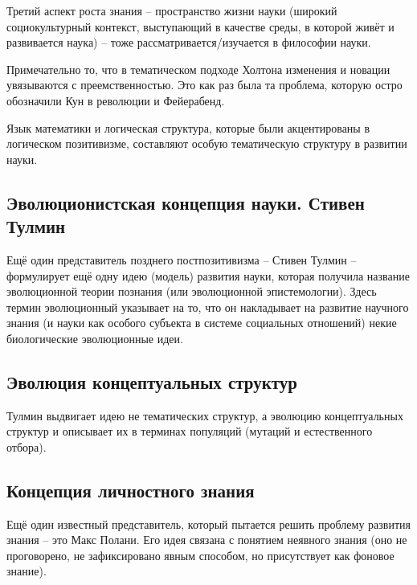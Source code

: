 \documentclass[main.tex]{subfiles}
\begin{document}

Третий аспект роста знания -- пространство жизни науки (широкий социокультурный контекст, выступающий в качестве среды, в которой живёт и развивается наука) -- тоже рассматривается/изучается в философии науки.


Примечательно то, что в тематическом подходе Холтона изменения и новации увязываются с преемственностью.
Это как раз была та проблема, которую остро обозначили Кун в революции и Фейерабенд.

Язык математики и логическая структура, которые были акцентированы в логическом позитивизме, составляют особую тематическую структуру в развитии науки.

\subsection{Эволюционистская концепция науки. Стивен Тулмин}


Ещё один представитель позднего постпозитивизма -- Стивен Тулмин -- формулирует ещё одну идею (модель) развития науки, которая получила название эволюционной теории познания (или эволюционной эпистемологии).
Здесь термин эволюционный указывает на то, что он накладывает на развитие научного знания (и науки как особого субъекта в системе социальных отношений) некие биологические эволюционные идеи.

\subsection{Эволюция концептуальных структур}


Тулмин выдвигает идею не тематических структур, а эволюцию концептуальных структур и описывает их в терминах популяций (мутаций и естественного отбора).

\subsection{Концепция личностного знания}


Ещё один известный представитель, который пытается решить проблему развития знания -- это Макс Полани.
Его идея связана с понятием неявного знания (оно не проговорено, не зафиксировано явным способом, но присутствует как фоновое знание).
\end{document}
